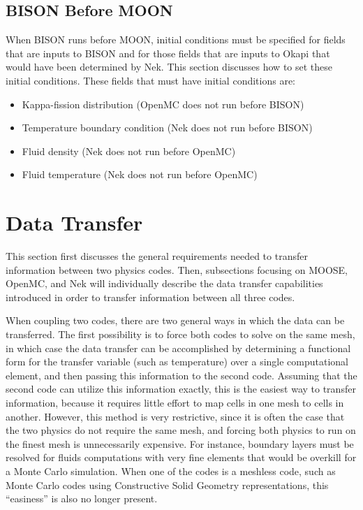\documentclass[10pt]{article}
\numberwithin{equation}{section} %
\begin{document}
\subsection{BISON Before MOON}
When BISON runs before MOON, initial conditions must be specified for fields that are inputs to BISON and for those fields that are inputs to Okapi that would have been determined by Nek. This section discusses how to set these initial conditions. These fields that must have initial conditions are:

\begin{itemize}
\item Kappa-fission distribution (OpenMC does not run before BISON)
\item Temperature boundary condition (Nek does not run before BISON)
\item Fluid density (Nek does not run before OpenMC)
\item Fluid temperature (Nek does not run before OpenMC)
\end{itemize}

\clearpage
\section{Data Transfer}
This section first discusses the general requirements needed to transfer information between two physics codes. Then, subsections focusing on MOOSE, OpenMC, and Nek will individually describe the data transfer capabilities introduced in order to transfer information between all three codes. 

When coupling two codes, there are two general ways in which the data can be transferred. The first possibility is to force both codes to solve on the same mesh, in which case the data transfer can be accomplished by determining a functional form for the transfer variable (such as temperature) over a single computational element, and then passing this information to the second code. Assuming that the second code can utilize this information exactly, this is the easiest way to transfer information, because it requires little effort to map cells in one mesh to cells in another. However, this method is very restrictive, since it is often the case that the two physics do not require the same mesh, and forcing both physics to run on the finest mesh is unnecessarily expensive. For instance, boundary layers must be resolved for fluids computations with very fine elements that would be overkill for a Monte Carlo simulation. When one of the codes is a meshless code, such as Monte Carlo codes using Constructive Solid Geometry representations, this ``easiness'' is also no longer present.
\end{document}
